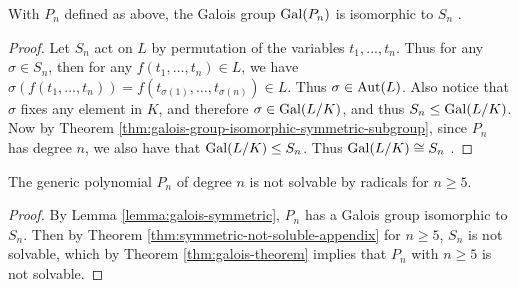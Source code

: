 \begin{lemma}\label{lemma:galois-symmetric}
	With $P_n$ defined as above, the Galois group $\operatorname{Gal}(P_n)$ is isomorphic to $S_n$ .
\end{lemma}

\begin{proof}
	
	Let $S_n$ act on $L$ by permutation of the variables $t_1,...,t_n$. Thus for any $\sigma \in S_n$, then for any $f(t_1,\dots,t_n) \in L $, we have 
	$   \sigma( f(t_1, \dots, t_n) )=f( t_{\sigma(1)},\dots,t_{\sigma(n)}) \in L. $
	Thus $\sigma \in \operatorname{Aut}(L)$.  Also notice that $\sigma$ fixes any element in $K$, and therefore
	 $\sigma \in \operatorname{Gal}(L/K)$, and thus $S_n \le \operatorname{Gal}(L/K)$.  Now by Theorem \ref{thm:galois-group-isomorphic-symmetric-subgroup}, since $P_n$ has degree $n$, we also have that $\operatorname{Gal}(L/K) \le S_n$. Thus $\operatorname{Gal}(L/K) \cong S_n$ . 
%	
\end{proof}


\begin{theorem}\label{thm:abel-ruffini-thm}
	The generic polynomial $P_n$ of degree $n$ is not solvable by radicals for $n \geq 5$. 
\end{theorem}

\begin{proof}
	By Lemma \ref{lemma:galois-symmetric}, $P_n$ has a Galois group isomorphic to $S_n$. Then by Theorem \ref{thm:symmetric-not-soluble-appendix} for $n \geq 5$, $S_n$ is not solvable, which by Theorem \ref{thm:galois-theorem} implies that $P_n$ with $n \ge 5$ is not solvable.
\end{proof}


